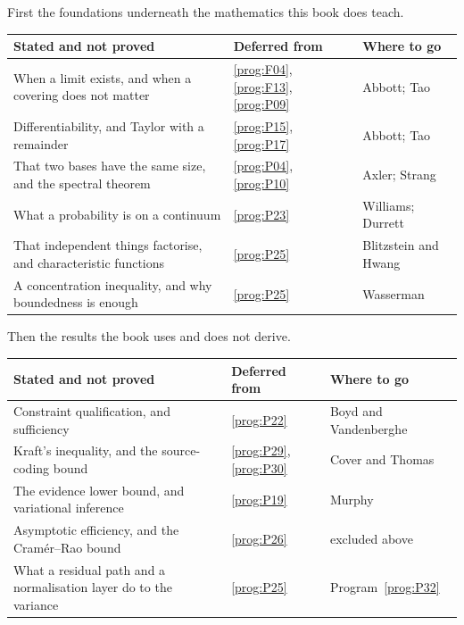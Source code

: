 \medskip
First the foundations underneath the mathematics this book does teach.

\begin{center}
\begin{tabularx}{\linewidth}{@{}Xll@{}}
\toprule
\textbf{Stated and not proved} & \textbf{Deferred from}
  & \textbf{Where to go} \\
\midrule
When a limit exists, and when a covering does not matter &
  \ref{prog:F04}, \ref{prog:F13}, \ref{prog:P09} & Abbott; Tao \\
Differentiability, and Taylor with a remainder &
  \ref{prog:P15}, \ref{prog:P17} & Abbott; Tao \\
That two bases have the same size, and the spectral theorem &
  \ref{prog:P04}, \ref{prog:P10} & Axler; Strang \\
What a probability is on a continuum &
  \ref{prog:P23} & Williams; Durrett \\
That independent things factorise, and characteristic functions &
  \ref{prog:P25} & Blitzstein and Hwang \\
A concentration inequality, and why boundedness is enough &
  \ref{prog:P25} & Wasserman \\
\bottomrule
\end{tabularx}
\end{center}

\medskip
Then the results the book uses and does not derive.

\begin{center}
\begin{tabularx}{\linewidth}{@{}Xll@{}}
\toprule
\textbf{Stated and not proved} & \textbf{Deferred from}
  & \textbf{Where to go} \\
\midrule
Constraint qualification, and sufficiency &
  \ref{prog:P22} & Boyd and Vandenberghe \\
Kraft's inequality, and the source-coding bound &
  \ref{prog:P29}, \ref{prog:P30} & Cover and Thomas \\
The evidence lower bound, and variational inference &
  \ref{prog:P19} & Murphy \\
Asymptotic efficiency, and the Cramér--Rao bound &
  \ref{prog:P26} & excluded above \\
What a residual path and a normalisation layer do to the variance &
  \ref{prog:P25} & Program~\ref{prog:P32} \\
\bottomrule
\end{tabularx}
\end{center}

